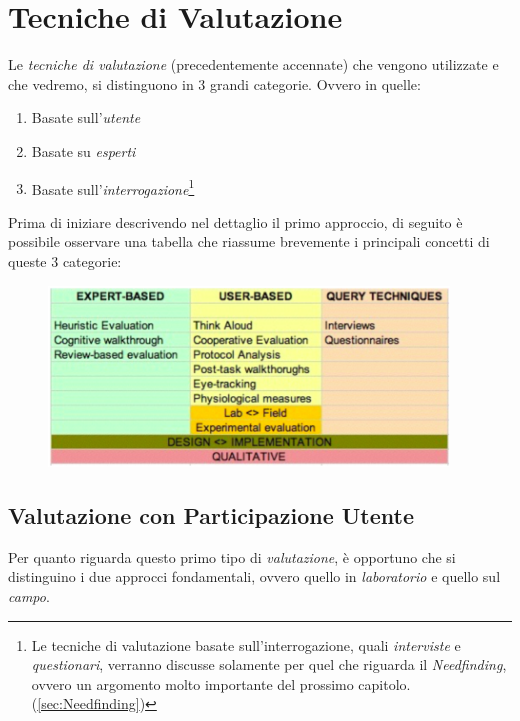\documentclass[oneside]{book}
\begin{document}
\chapter{Tecniche di Valutazione}  
	Le \emph{tecniche di valutazione} (precedentemente accennate) che vengono utilizzate e che vedremo, si distinguono in 3 grandi categorie. Ovvero in quelle:
	\begin{enumerate}
		\item Basate sull'\emph{utente}
		\item Basate su \emph{esperti}
		\item Basate sull'\emph{interrogazione}\footnote{ Le tecniche di valutazione basate sull'interrogazione, quali \emph{interviste} e \emph{questionari}, verranno discusse solamente per quel che riguarda il \emph{Needfinding}, ovvero un argomento molto importante del prossimo capitolo. (\ref{sec:Needfinding})} 
	\end{enumerate}
	Prima di iniziare descrivendo nel dettaglio il primo approccio, di seguito è possibile osservare una tabella che riassume brevemente i principali concetti di queste 3 categorie:
	\begin{figure}[h] \label{fig:schemaTecnicheVal}
		\centering%
		\includegraphics[height = 48mm]{images/schema.png}
	\end{figure}

	\section{Valutazione con Participazione Utente} 
		Per quanto riguarda questo primo tipo di \emph{valutazione}, è opportuno che si distinguino i due approcci fondamentali, ovvero quello in \emph{laboratorio} e quello sul \emph{campo}.
		
\end{document}
